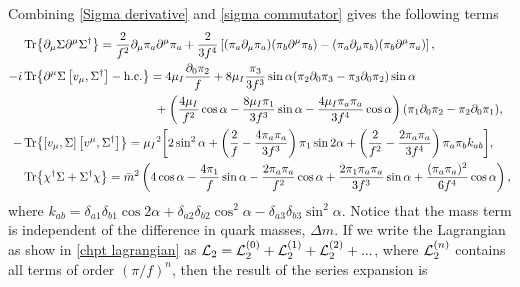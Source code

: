 %
Combining \cref{Sigma derivative} and \cref{sigma commutator} gives the following terms
\begin{align}
    & \Tr{\partial_\mu \Sigma \partial^\mu \Sigma^\dagger}
    = \frac{2}{f^2} \partial_\mu \pi_a \partial^\mu \pi_a
    + \frac{2}{3f^4}
    \left[
        (\pi_a\partial_\mu \pi_a)(\pi_b\partial^\mu \pi_b)
        -        
        (\pi_a\partial_\mu \pi_b)(\pi_b\partial^\mu \pi_a)
    \right], \\
    \nonumber
    -i  &\Tr{\partial^\mu\Sigma\left[v_\mu, \Sigma^\dagger \right] - \mathrm{h.c.}}
    =
    4 \mu_I \frac{\partial_0\pi_2}{f}
    + 8 \mu_I \frac{\pi_3}{3f^3}\sin{\alpha}(
        \pi_2 \partial_0 \pi_3 - \pi_3 \partial_0 \pi_2
        ) \sin{\alpha}
    \\ & \quad \quad \quad \quad \quad \quad \quad \quad \quad \quad \quad
    +
    \left(
        \frac{4\mu_I}{f^2} \cos{\alpha}
        - \frac{8 \mu_I\pi_1}{3f^3} \sin{\alpha}
        - \frac{4 \mu_I \pi_a \pi_a} {3f^4}\cos{\alpha} 
    \right) 
    (\pi_1\partial_0 \pi_2 - \pi_2 \partial_0 \pi_1), \\
    - & \Tr{\left[v_\mu, \Sigma \right]\left[v^\mu, \Sigma^\dagger \right]}
    = \mu_I{}^2
    \bigg[
        2 \sin^2{\alpha}
        +
        \left(
            \frac{2}{f} 
            - \frac{4\pi_a \pi_a}{3 f^3} 
        \right)
        \pi_1  \sin{2\alpha}
        + \left(
            \frac{2}{f^2}
            - \frac{2 \pi_a \pi_a}{3 f^4} 
        \right)
        \pi_a \pi_b k_{ab}
    \bigg], 
    \\
    & \Tr{\chi^\dagger \Sigma + \Sigma^\dagger\chi}
    = 
    \bar m^2 
    \left(
        4 \cos{\alpha} 
        - \frac{4 \pi_1}{f} \sin{\alpha} 
        - \frac{2 \pi_a \pi_a}{f^2} \cos{\alpha}
        + \frac{2 \pi_1 \pi_a \pi_a}{3 f^3} \sin{\alpha}
        + \frac{(\pi_a \pi_a)^2}{6 f^4}\cos{\alpha}
    \right), 
    \end{align}
where $k_{ab} =\delta_{a1} \delta_{b1} \cos{2\alpha}  + \delta_{a2}\delta_{b2}\cos^2{\alpha} - \delta_{a3}\delta_{b3} \sin^2{\alpha}$.
Notice that the mass term is independent of the difference in quark masses, $\Delta m$.
If we write the Lagrangian as show in \cref{chpt lagrangian} as $\mathcal{L}_2 = \mathcal{L}_2^{(0)} + \mathcal{L}_2^{(1)} + \mathcal{L}_2^{(2)} +...$, where $\mathcal{L}_2^{(n)}$ contains all terms of order $(\pi/f)^n$, then the result of the series expansion is
